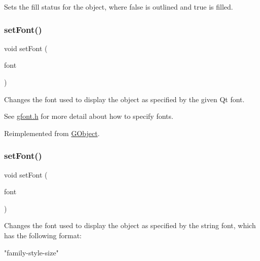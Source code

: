 Sets the fill status for the object, where {\ttfamily false} is outlined and {\ttfamily true} is filled. 

\mbox{\label{classGText_a2d22014c7fa3bccfd58c982aea1b55fa}} 
\subsubsection{\texorpdfstring{set\+Font()}{setFont()}\hspace{0.1cm}{\footnotesize\ttfamily [1/2]}}
{\footnotesize\ttfamily void set\+Font (\begin{DoxyParamCaption}\item[{const Q\+Font \&}]{font }\end{DoxyParamCaption})\hspace{0.3cm}{\ttfamily [virtual]}}



Changes the font used to display the object as specified by the given Qt font. 

See \mbox{\hyperlink{gfont_8h_source}{gfont.\+h}} for more detail about how to specify fonts. 

Reimplemented from \mbox{\hyperlink{classGObject_a2592348886ffea646c6534bf88f7c49d}{G\+Object}}.

\mbox{\label{classGText_ab39ef411fb13a52852ddd138c5932e2e}} 
\subsubsection{\texorpdfstring{set\+Font()}{setFont()}\hspace{0.1cm}{\footnotesize\ttfamily [2/2]}}
{\footnotesize\ttfamily void set\+Font (\begin{DoxyParamCaption}\item[{const std\+::string \&}]{font }\end{DoxyParamCaption})\hspace{0.3cm}{\ttfamily [virtual]}}



Changes the font used to display the object as specified by the string {\ttfamily font}, which has the following format\+: 


\begin{DoxyPre}
"family-style-size"
\end{DoxyPre}


